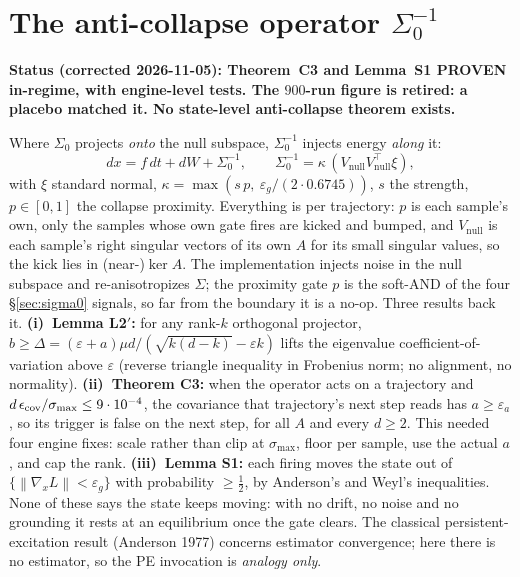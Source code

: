 \documentclass[11pt]{article}
\theoremstyle{definition}
\newcommand{\norm}[1]{\left\lVert#1\right\rVert}
\newcommand{\Szero}{\Sigma_0}
\begin{document}
\section{The anti-collapse operator $\Sigma_0^{-1}$}
\begin{caveatbox}
\textbf{Status (corrected 2026-11-05): Theorem~C3 and Lemma~S1 PROVEN in-regime, with engine-level tests.
The $900$-run figure is retired: a placebo matched it. No state-level anti-collapse theorem exists.}
\end{caveatbox}
Where $\Szero$ projects \emph{onto} the null subspace, $\Sigma_0^{-1}$ injects
energy \emph{along} it:
\begin{equation}
dx = f\,dt + dW + \Sigma_0^{-1}, \qquad
\Sigma_0^{-1} = \kappa\,(V_{\mathrm{null}}V_{\mathrm{null}}^\top\xi),
\end{equation}
with $\xi$ standard normal, $\kappa=\max(s\,p,\ \varepsilon_g/(2\cdot0.6745))$, $s$ the strength,
$p\in[0,1]$ the collapse proximity. Everything is per trajectory: $p$ is each sample's own, only the samples whose
own gate fires are kicked and bumped, and $V_{\mathrm{null}}$ is each sample's right singular vectors of its own $A$
for its small singular values, so the kick lies in (near-)$\ker A$.
The implementation injects noise in the null subspace and re-anisotropizes $\Sigma$;
the proximity gate $p$ is the soft-AND of the four \S\ref{sec:sigma0} signals, so far
from the boundary it is a no-op. Three results back it. \textbf{(i)~Lemma L2$'$:} for any
rank-$k$ orthogonal projector, $b\ge\Delta=(\varepsilon+a)\mu d/(\sqrt{k(d-k)}-\varepsilon k)$ lifts the
eigenvalue coefficient-of-variation above $\varepsilon$ (reverse triangle inequality in Frobenius norm; no
alignment, no normality). \textbf{(ii)~Theorem C3:} when the operator acts on a trajectory and
$d\,\epsilon_{\rm cov}/\sigma_{\max}\le 9\cdot10^{-4}$, the covariance that trajectory's next step reads has
$a\ge\varepsilon_a$, so its trigger is false on the next step, for all $A$ and every $d\ge2$. This
needed four engine fixes: scale rather than clip at $\sigma_{\max}$, floor per sample, use the actual $a$, and cap the
rank. \textbf{(iii)~Lemma S1:} each firing moves the state out of $\{\norm{\nabla_x L}<\varepsilon_g\}$ with
probability $\ge\tfrac12$, by Anderson's and Weyl's inequalities. None of these says the state keeps moving: with no
drift, no noise and no grounding it rests at an equilibrium once the gate clears. The classical persistent-excitation
result (Anderson 1977) concerns estimator convergence; here there is no estimator, so the PE invocation is
\emph{analogy only}.
\end{document}
